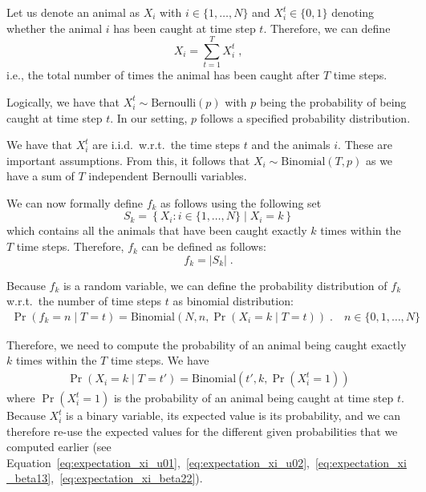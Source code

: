 \documentclass{article}
\begin{document}
Let us denote an animal as $X_i$ with $i\in \{1, \dots, N\}$ and $X_i^t\in \{0, 1\}$ denoting whether the animal $i$ has been caught at time step $t$.
Therefore, we can define 
\begin{equation*}
    X_i = \sum_{t=1}^T X_i^t\;,
\end{equation*}
i.e., the total number of times the animal has been caught after $T$ time steps.

Logically, we have that $X_i^t \sim \mathrm{Bernoulli}(p)$ with $p$ being the probability of being caught at time step $t$. In our setting, $p$ follows a specified probability distribution.

We have that $X_i^t$ are i.i.d.\ w.r.t.\ the time steps $t$ and the animals $i$. These are important assumptions.
From this, it follows that $X_i \sim \mathrm{Binomial}(T, p)$ as we have a sum of $T$ independent Bernoulli variables.

We can now formally define $f_k$ as follows using the following set 
\begin{equation*}
    S_k = \left\{ X_i : i \in \{1, \dots, N\} \mid X_i = k \right\}
\end{equation*}
which contains all the animals that have been caught exactly $k$ times within the $T$ time steps.
Therefore, $f_k$ can be defined as follows:
\begin{equation*}
    f_k = |S_k|\;.
\end{equation*}

Because $f_k$ is a random variable, we can define the probability distribution of $f_k$ w.r.t.\ the number of time steps $t$ as binomial distribution:
\begin{align*}
    \Pr(f_k = n\mid T=t) = \mathrm{Binomial}(N, n, \Pr(X_i = k\mid T=t))\;. \quad n \in \{0, 1, \dots, N\}
\end{align*}

Therefore, we need to compute the probability of an animal being caught exactly $k$ times within the $T$ time steps. We have
\begin{align*}
    \Pr(X_i = k \mid T=t') = \mathrm{Binomial}(t', k, \Pr(X_i^t = 1))
\end{align*}
where $\Pr(X_i^t = 1)$ is the probability of an animal being caught at time step $t$.
Because $X_i^t$ is a binary variable, its expected value is its probability, and we can therefore re-use the expected values for the different given probabilities that we computed earlier (see Equation~\ref{eq:expectation_xi_u01},~\ref{eq:expectation_xi_u02},~\ref{eq:expectation_xi_beta13},~\ref{eq:expectation_xi_beta22}).
\end{document}
